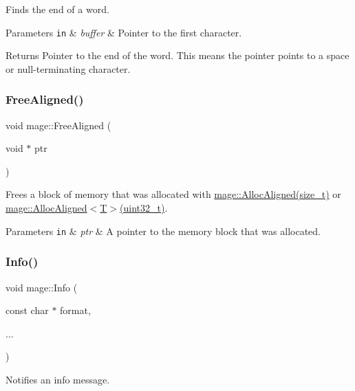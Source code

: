 Finds the end of a word.


\begin{DoxyParams}[1]{Parameters}
\mbox{\tt in}  & {\em buffer} & Pointer to the first character. \\
\hline
\end{DoxyParams}
\begin{DoxyReturn}{Returns}
Pointer to the end of the word. This means the pointer points to a space or null-\/terminating character. 
\end{DoxyReturn}
\hypertarget{namespacemage_a401c54df21447c491c527735647b5f80}{}\label{namespacemage_a401c54df21447c491c527735647b5f80} 
\subsubsection{\texorpdfstring{Free\+Aligned()}{FreeAligned()}}
{\footnotesize\ttfamily void mage\+::\+Free\+Aligned (\begin{DoxyParamCaption}\item[{void $\ast$}]{ptr }\end{DoxyParamCaption})}

Frees a block of memory that was allocated with \hyperlink{namespacemage_a7d706913bb9fb322c938cd3e4d8eaede}{mage\+::\+Alloc\+Aligned(size\+\_\+t)} or \hyperlink{namespacemage_ae2f31ba64620694aa0dfc8ca6e5d5941}{mage\+::\+Alloc\+Aligned$<$\+T$>$(uint32\+\_\+t)}.


\begin{DoxyParams}[1]{Parameters}
\mbox{\tt in}  & {\em ptr} & A pointer to the memory block that was allocated. \\
\hline
\end{DoxyParams}
\hypertarget{namespacemage_add6aa5f13960ce07b20f48d273956a91}{}\label{namespacemage_add6aa5f13960ce07b20f48d273956a91} 
\subsubsection{\texorpdfstring{Info()}{Info()}}
{\footnotesize\ttfamily void mage\+::\+Info (\begin{DoxyParamCaption}\item[{const char $\ast$}]{format,  }\item[{}]{... }\end{DoxyParamCaption})}

Notifies an info message.



